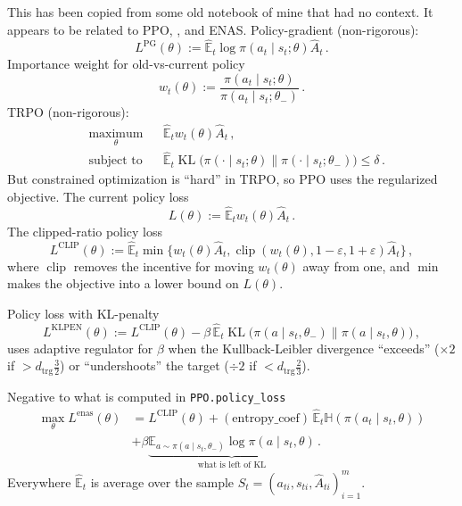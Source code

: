 \documentclass{article}
\begin{document}
This has been copied from some old notebook of mine that had no context. It appears to be
related to PPO, \citep{schulman_proximal_2017}, and ENAS.
%
Policy-gradient (non-rigorous):
$$
L^\text{PG}(\theta)
    := \hat{\mathbb{E}}_t
        \log \pi(a_t\mid s_t; \theta) \widehat{A}_t
    \,. $$
Importance weight for old-vs-current policy
$$
w_t(\theta)
    := \frac{\pi(a_t \mid s_t; \theta)}{\pi(a_t \mid s_t; \theta_-)}
\,. $$
TRPO (non-rigorous):
$$
\begin{aligned}
    &\underset{\theta}{\text{maximum}}
      & &
        \hat{\mathbb{E}}_t w_t(\theta) \widehat{A}_t
        \,, \\
    & \text{subject to}
      & & \hat{\mathbb{E}}_t
        \operatorname{KL}\bigl(
            \pi(\cdot \mid s_t; \theta)
            \| \pi(\cdot \mid s_t; \theta_-)
        \bigr) \leq \delta
    \,.
\end{aligned}
    $$
But constrained optimization is ``hard'' in TRPO, so PPO uses the regularized objective.
% 
The current policy loss
$$
L(\theta)
    := \hat{\mathbb{E}}_t w_t(\theta) \widehat{A}_t
    \,. $$
The clipped-ratio policy loss
$$
L^\text{CLIP}(\theta)
    := \hat{\mathbb{E}}_t \min\bigl\{
        w_t(\theta) \widehat{A}_t,
        \operatorname{clip}(w_t(\theta), 1 - \varepsilon, 1 + \varepsilon) \widehat{A}_t
    \bigr\}
    \,, $$
where $\operatorname{clip}$ removes the incentive for moving $w_t(\theta)$ away from one,
and $\min$ makes the objective into a lower bound on $L(\theta)$.

Policy loss with KL-penalty
$$
L^\text{KLPEN}(\theta)
    := L^\text{CLIP}(\theta)
    - \beta \, \hat{\mathbb{E}}_t
        \operatorname{KL}\bigl(
            \pi(a \mid s_t, \theta_-)
            \| \pi(a \mid s_t, \theta)
        \bigr)
    \,, $$
uses adaptive regulator for $\beta$ when the Kullback-Leibler divergence ``exceeds''
($\times 2$ if $> d_\text{trg} \frac32$) or ``undershoots'' the target ($\div 2$
if $< d_\text{trg} \frac23$).

Negative to what is computed in \texttt{PPO.policy\_loss}
\begin{align}
\max_\theta L^\text{enas}(\theta)
    &= L^\text{CLIP}(\theta)
        + (\mathrm{entropy\_coef})\, \hat{\mathbb{E}}_t \mathbb{H}(\pi(a_t\mid s_t, \theta))
    \\
        &+ \beta \underbrace{
            \mathbb{E}_{a\sim \pi(a \mid s_t, \theta_-)} \log \pi(a \mid s_t, \theta)
        }_{\text{what is left of KL}}
    \,.
\end{align}
Everywhere $\hat{\mathbb{E}}_t$ is average over the sample $
    S_t = (a_{ti}, s_{ti}, \widehat{A}_{ti})_{i=1}^m
$.

\end{document}
